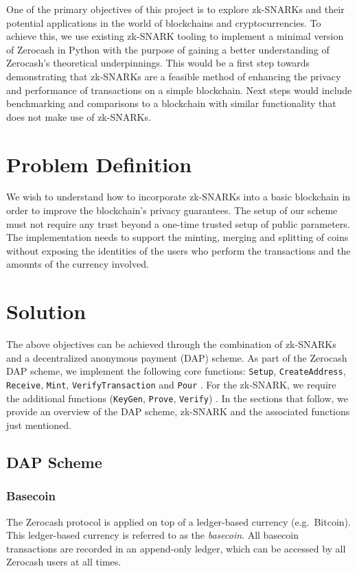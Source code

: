 \documentclass{article}
\begin{document}
One of the primary objectives of this project is to explore zk-SNARKs and their potential applications in the world of blockchains and cryptocurrencies. To achieve this, we use existing zk-SNARK tooling to implement a minimal version of Zerocash in Python with the purpose of gaining a better understanding of Zerocash's theoretical underpinnings. This would be a first step towards demonstrating that zk-SNARKs are a feasible method of enhancing the privacy and performance of transactions on a simple blockchain. Next steps would include benchmarking and comparisons to a blockchain with similar functionality that does not make use of zk-SNARKs.

\section{Problem Definition}
We wish to understand how to incorporate zk-SNARKs into a basic blockchain in order to improve the blockchain's privacy guarantees. The setup of our scheme must not require any trust beyond a one-time trusted setup of public parameters. The implementation needs to support the minting, merging and splitting of coins without exposing the identities of the users who perform the transactions and the amounts of the currency involved.

\section{Solution}
The above objectives can be achieved through the combination of zk-SNARKs and a decentralized anonymous payment (DAP) scheme. As part of the Zerocash DAP scheme, we implement the following core functions: \texttt{Setup}, \texttt{CreateAddress}, \texttt{Receive}, \texttt{Mint}, \texttt{VerifyTransaction} and \texttt{Pour} \cite{zerocash}. For the zk-SNARK, we require the additional functions (\texttt{KeyGen}, \texttt{Prove}, \texttt{Verify}) \cite{zerocash}. In the sections that follow, we provide an overview of the DAP scheme, zk-SNARK and the associated functions just mentioned.

\subsection{DAP Scheme}
\subsubsection{Basecoin}
The Zerocash protocol is applied on top of a ledger-based currency (e.g.\ Bitcoin). This ledger-based currency is referred to as the \emph{basecoin}. All basecoin transactions are recorded in an append-only ledger, which can be accessed by all Zerocash users at all times.
\end{document}
